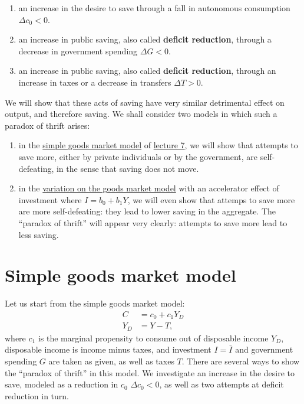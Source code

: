 \documentclass[]{book}
\theoremstyle{definition}
\theoremstyle{definition}
\theoremstyle{definition}
\theoremstyle{remark}
\begin{document}
\begin{enumerate}
\def\labelenumi{\arabic{enumi}.}
\item
  an increase in the desire to save through a fall in autonomous
  consumption \(\Delta c_0<0\).
\item
  an increase in public saving, also called \textbf{deficit reduction},
  through a decrease in government spending \(\Delta G<0\).
\item
  an increase in public saving, also called \textbf{deficit reduction},
  through an increase in taxes or a decrease in transfers
  \(\Delta T>0\).
\end{enumerate}

We will show that these acts of saving have very similar detrimental
effect on output, and therefore saving. We shall consider two models in
which such a paradox of thrift arises:

\begin{enumerate}
\def\labelenumi{\arabic{enumi}.}
\item
  in the \protect\hyperlink{simple}{simple goods market model} of
  \href{lecture7.html}{lecture 7}, we will show that attempts to save
  more, either by private individuals or by the government, are
  self-defeating, in the sense that saving does not move.
\item
  in the \protect\hyperlink{extended}{variation on the goods market
  model} with an accelerator effect of investment where \(I=b_0+b_1Y\),
  we will even show that attemps to save more are more self-defeating:
  they lead to lower saving in the aggregate. The ``paradox of thrift''
  will appear very clearly: attempts to save more lead to less saving.
\end{enumerate}

\hypertarget{simple}{\section{Simple goods market model}\label{simple}}

Let us start from the simple goods market model: \[
\begin{aligned}
C   &=c_{0}+c_{1}Y_{D}\\
Y_{D}   &=Y-T,
\end{aligned}
\] where \(c_{1}\) is the marginal propensity to consume out of
disposable income \(Y_{D}\), disposable income is income minus taxes,
and investment \(I=\bar{I}\) and government spending \(G\) are taken as
given, as well as taxes \(T\). There are several ways to show the
``paradox of thrift'' in this model. We investigate an increase in the
desire to save, modeled as a reduction in \(c_0\) \(\Delta c_0<0\), as
well as two attempts at deficit reduction in turn.
\end{document}
